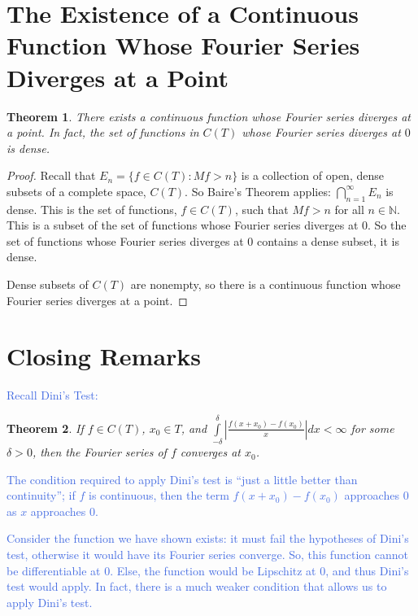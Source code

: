 \documentclass{amsart}
\newcommand{\de}{\delta}
\newcommand{\N}{\mathbb{N}}
\newcommand{\colorcomment}[2]{\textcolor{#1}{#2}} %
\newcommand{\absval}[1]{\left| #1 \right|}
\newtheorem{thm}{Theorem}[section]
\theoremstyle{definition}
\begin{document}
\section{The Existence of a Continuous Function Whose Fourier Series Diverges at a Point}

\begin{thm}
There exists a continuous function whose Fourier series diverges at a point.
In fact, the set of functions in $C(T)$ whose Fourier series diverges at $0$ is dense.
\end{thm}

\begin{proof}

Recall that 
$E_n = \{f \in C(T) : Mf > n\}$
is a collection of open, dense subsets of a complete space, $C(T)$. 
So Baire's Theorem applies: $\bigcap\limits_{n=1}^\infty E_n $ is dense.
This is the set of functions, $f \in C(T)$, such that $Mf >n$ for all $n \in \N$.
This is a subset of the set of functions whose Fourier series diverges at $0$.
So the set of functions whose Fourier series diverges at $0$ contains a dense subset, it is dense.

Dense subsets of $C(T)$ are nonempty, so there is a continuous function whose Fourier series diverges at a point.

\end{proof}

\section{Closing Remarks}

\colorcomment{RoyalBlue}{Recall Dini's Test:}

\begin{thm}
If $f \in C(T)$, $x_0 \in T$, and $\int\limits_{-\de}^{\de} \absval{\frac{f(x+x_0) - f(x_0)}{x}} dx < \infty$ for some $\de >0$, then the Fourier series of $f$ converges at $x_0$.
\end{thm}

\colorcomment{RoyalBlue}{The condition required to apply Dini's test is ``just a little better than continuity''; if $f$ is continuous, then the term $f(x+x_0) - f(x_0)$ approaches $0$ as $x$ approaches $0$.}

\colorcomment{RoyalBlue}{Consider the function we have shown exists: it must fail the hypotheses of Dini's test, otherwise it would have its Fourier series converge. 
So, this function cannot be differentiable at $0$. 
Else, the function would be Lipschitz at $0$, and thus Dini's test would apply. 
In fact, there is a much weaker condition that allows us to apply Dini's test.}
\end{document}
